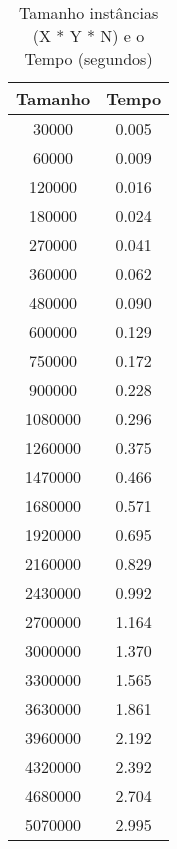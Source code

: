 \documentclass[12pt]{article}
\begin{document}
\begin{table}[h]
    \centering
    \begin{tabular}{|c|c|}
        \hline
        \textbf{Tamanho} & \textbf{Tempo} \\
        \hline
        30000 & 0.005 \\
        60000 & 0.009 \\
        120000 & 0.016 \\
        180000 & 0.024 \\
        270000 & 0.041 \\
        360000 & 0.062 \\
        480000 & 0.090 \\
        600000 & 0.129 \\
        750000 & 0.172 \\
        900000 & 0.228 \\
        1080000 & 0.296 \\
        1260000 & 0.375 \\
        1470000 & 0.466 \\
        1680000 & 0.571 \\
        1920000 & 0.695 \\
        2160000 & 0.829 \\
        2430000 & 0.992 \\
        2700000 & 1.164 \\
        3000000 & 1.370 \\
        3300000 & 1.565 \\
        3630000 & 1.861 \\
        3960000 & 2.192 \\
        4320000 & 2.392 \\
        4680000 & 2.704 \\
        5070000 & 2.995 \\
        \hline
    \end{tabular}
    \caption{Tamanho instâncias (X * Y * N) e o Tempo (segundos)}
\end{table}
\end{document}

